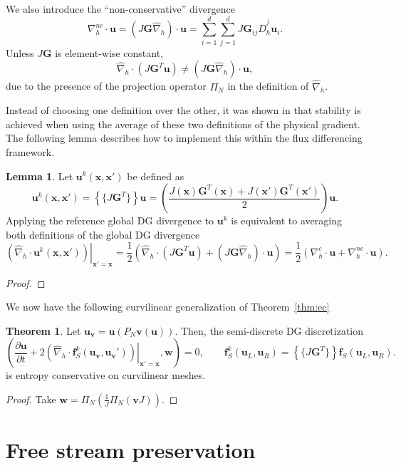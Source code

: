 \documentclass[preprint,10pt]{article}
\theoremstyle{definition}
\theoremstyle{lemma}
\newtheorem{lemma}{Lemma}
\theoremstyle{theorem}
\newtheorem{theorem}{Theorem}
\theoremstyle{assumption}
\renewcommand{\hat}{\widehat}
\newcommand{\pd}[2]{\frac{\partial#1}{\partial#2}}
\newcommand{\LRp}[1]{\left( #1 \right)}
\newcommand{\LRc}[1]{\left\{ #1 \right\}}
\newcommand{\LRl}[1]{\left. \LRp{#1} \right|}
\newcommand{\avg}[1] {\ensuremath{\LRc{\!\{#1\}\!}}}
\newcommand{\Grad} {\ensuremath{\nabla}}
\newcommand{\note}[1]{{\color{blue}{#1}}}
\begin{document}
We also introduce the ``non-conservative'' divergence 
\[
\Grad_h^{nc} \cdot \bm{u} = \LRp{J\bm{G}\hat{\Grad}_h}\cdot \bm{u} = \sum_{i=1}^d \sum_{j=1}^d J\bm{G}_{ij} \hat{D}^j_h\bm{u}_i.
\]
Unless $J\bm{G}$ is element-wise constant,
\[
\hat{\Grad}_h\cdot\LRp{J\bm{G}^T\bm{u}} \neq \LRp{J\bm{G}\hat{\Grad}_h}\cdot\bm{u}, 
\]
due to the presence of the projection operator $\Pi_N$ in the definition of $\hat{\Grad}_h$.  

Instead of choosing one definition over the other, it was shown in \cite{wintermeyer2017entropy} that stability is achieved when using the average of these two definitions of the physical gradient.  The following lemma describes how to implement this within the flux differencing framework.
\begin{lemma}
Let $\bm{u}^k(\bm{x},\bm{x}')$ be defined as
\[
\bm{u}^k(\bm{x},\bm{x}') = \avg{J\bm{G}^T}\bm{u} = \LRp{\frac{J(\bm{x})\bm{G}^T(\bm{x}) + J(\bm{x}')\bm{G}^T(\bm{x}')}{2}}\bm{u}.
\]
Applying the reference global DG divergence to $\bm{u}^k$ is equivalent to averaging both definitions of the global DG divergence
\[
\LRl{{\hat{\Grad}_h \cdot \bm{u}^k(\bm{x},\bm{x}')}}_{\bm{x}'=\bm{x}} = \frac{1}{2}\LRp{\hat{\Grad}_h\cdot\LRp{J\bm{G}^T\bm{u}} + \LRp{J\bm{G}\hat{\Grad}_h}\cdot\bm{u}} = \frac{1}{2}\LRp{\Grad^c_h\cdot \bm{u} + \Grad_h^{nc}\cdot\bm{u}}.
\]
\end{lemma}
\begin{proof}
\note{TBD.}
\end{proof}

We now have the following curvilinear generalization of Theorem~\ref{thm:ec}
\begin{theorem}
\label{thm:ec_curvi}
Let $\bm{u}_{\bm{v}} = \bm{u}\LRp{P_N\bm{v}(\bm{u})}$.  Then, the semi-discrete DG discretization 
\[
\LRp{\pd{\bm{u}}{t} + 2\LRl{\hat{\Grad}_h\cdot \bm{f}^k_S(\bm{u}_{\bm{v}},\bm{u}_{\bm{v}}')}_{\bm{x}'=\bm{x}},\bm{w}} = 0, \qquad \bm{f}^k_S(\bm{u}_L,\bm{u}_R) = \avg{J\bm{G}^T}\bm{f}_S(\bm{u}_L,\bm{u}_R).
\]
is entropy conservative on curvilinear meshes.  
\end{theorem}
\begin{proof}
Take $\bm{w} = \Pi_N\LRp{\frac{1}{J}\Pi_N\LRp{ \bm{v}J}}$.  

\end{proof}




\section{Free stream preservation}
\end{document}
